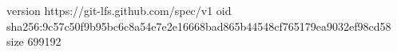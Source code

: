 version https://git-lfs.github.com/spec/v1
oid sha256:9c57c50f9b95bc6c8a54e7e2e16668bad865b44548cf765179ea9032ef98cd58
size 699192
